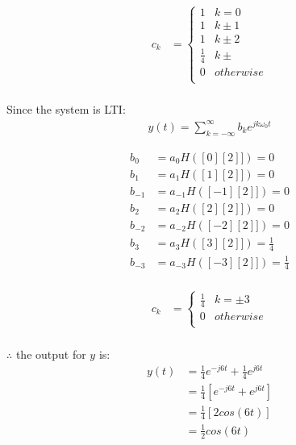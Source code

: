 \documentclass{article}
\begin{document}
\begin{equation*}
\begin{split}
     c_k
    &= \begin{cases}
        1 & k = 0\\
        1 & k \pm 1\\
        1 & k \pm 2\\
        \frac{1}{4} & k \pm\\
        0 & otherwise\\
    \end{cases}\\
\end{split}
\end{equation*}

Since the system is LTI:
\begin{equation*}
\begin{split}
    y(t) = \sum_{k = -\infty}^{\infty} b_ke^{jk\omega_0 t}
\end{split}
\end{equation*}

\begin{equation*}
\begin{split}
    b_0 &= a_0H([0][2]]) = 0\\
    b_1 &= a_1H([1][2]]) = 0\\
    b_{-1} &= a_{-1}H([-1][2]]) = 0\\
    b_{2} &= a_{2}H([2][2]]) = 0\\
    b_{-2} &= a_{-2}H([-2][2]]) = 0\\
    b_{3} &= a_{3}H([3][2]]) = \frac{1}{4}\\
    b_{-3} &= a_{-3}H([-3][2]]) = \frac{1}{4}\\
\end{split}
\end{equation*}

\begin{equation*}
\begin{split}
     c_k
    &= \begin{cases}
        \frac{1}{4} & k = \pm 3\\
        0 & otherwise\\
    \end{cases}\\
\end{split}
\end{equation*}

$\therefore$ the output for $y$ is:
\begin{equation*}
\begin{split}
    y(t) &= \frac{1}{4}e^{-j6t} + \frac{1}{4}e^{j6t}\\
    &= \frac{1}{4}[e^{-j6t} + e^{j6t}]\\
    &= \frac{1}{4} [2cos(6t)]\\
    &= \frac{1}{2}cos(6t)\\
\end{split}
\end{equation*}
\end{document}
